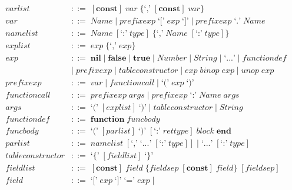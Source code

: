 \begin{align*}
\textit{varlist} & ::= \; [\textbf{const}] \; \textit{var} \;
  \{\texttt{`,'} \; [\textbf{const}] \; \textit{var}\}\\
\textit{var} & ::= \; \textit{Name} \; | \;
  \textit{prefixexp} \; \texttt{`['} \; \textit{exp} \; \texttt{`]'} \; | \;
  \textit{prefixexp} \; \texttt{`.'} \; \textit{Name}\\
\textit{namelist} & ::= \; \textit{Name} \; [\texttt{`:'} \; \textit{type}] \;
  \{\texttt{`,'} \; \textit{Name} \; [\texttt{`:'} \; \textit{type}]\}\\
\textit{explist} & ::= \; \textit{exp} \; \{\texttt{`,'} \; \textit{exp}\}\\
\textit{exp} & ::= \; \textbf{nil} \; | \;
  \textbf{false} \; | \;
  \textbf{true} \; | \;
  \textit{Number} \; | \;
  \textit{String} \; | \;
  \texttt{`...'} \; | \;
  \textit{functiondef}\\
& | \; \textit{prefixexp} \; | \;
  \textit{tableconstructor} \; | \;
  \textit{exp} \; \textit{binop} \; \textit{exp} \; | \;
  \textit{unop} \; \textit{exp}\\
\textit{prefixexp} & ::= \; \textit{var} \; | \;
  \textit{functioncall} \; | \;
  \texttt{`('} \; \textit{exp} \; \texttt{`)'}\\
\textit{functioncall} & ::= \; \textit{prefixexp} \; \textit{args} \; | \;
  \textit{prefixexp} \; \texttt{`:'} \; \textit{Name} \; \textit{args}\\
\textit{args} & ::= \; \texttt{`('} \; [\textit{explist}] \; \texttt{`)'} \; | \;
  \textit{tableconstructor} \; | \;
  \textit{String}\\
\textit{functiondef} & ::= \; \textbf{function} \; \textit{funcbody}\\
\textit{funcbody} & ::= \; \texttt{`('} \; [\textit{parlist}] \; \texttt{`)'} \;
  [\texttt{`:'} \; \textit{rettype}] \; \textit{block} \; \textbf{end}\\
\textit{parlist} & ::= \; \textit{namelist} \; [\texttt{`,'} \; \texttt{`...'} \;
  [\texttt{`:'} \; \textit{type}]] \; | \;
  \texttt{`...'} \; [\texttt{`:'} \; \textit{type}]\\
\textit{tableconstructor} & ::= \; \texttt{`\{'} \; [\textit{fieldlist}] \; \texttt{`\}'}\\
\textit{fieldlist} & ::= \; [\textbf{const}] \; \textit{field} \;
  \{\textit{fieldsep} \; [\textbf{const}] \; \textit{field}\} \; [\textit{fieldsep}]\\
\textit{field} & ::= \; \texttt{`['} \; \textit{exp} \; \texttt{`]'} \; \texttt{`='} \; \textit{exp} \; | \;

\end{align*}
